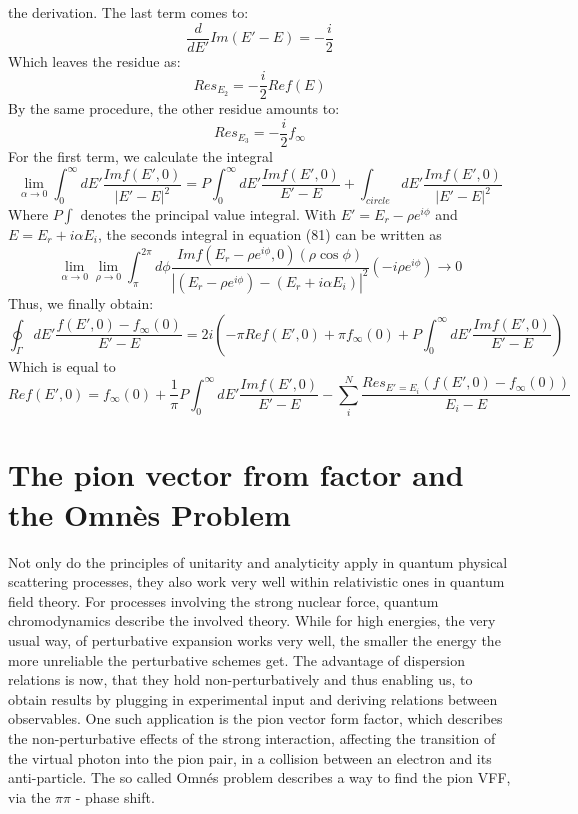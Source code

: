 \documentclass[a4paper]{article}
\begin{document}
the derivation. The last term comes to:
\begin{equation}
    \frac{d}{dE'}Im(E'-E)=-\frac{i}{2}
\end{equation}
Which leaves the residue as:
\begin{equation}
   Res_{E_2}=-\frac{i}{2}Ref(E)
\end{equation}
By the same procedure, the other residue amounts to:
\begin{equation}
    Res_{E_3}=-\frac{i}{2}f_\infty
\end{equation}
For the first term, we calculate the integral
\begin{equation}
   \lim\limits_{\alpha\rightarrow 0}\int_0^\infty dE'\frac{Imf(E',0)}{|E'-E|^2}=P\int_0^\infty dE'\frac{Imf(E',0)}{E'-E}+\int_{circle}dE'\frac{Imf(E',0)}{|E'-E|^2}
\end{equation}
Where $P\int$ denotes the principal value integral. With $E'=E_r-\rho e^{i\phi}$ and $E=E_r+i\alpha E_i$, the seconds integral in equation (81) can be written as
\begin{equation}
    \lim\limits_{\alpha\rightarrow 0}\lim\limits_{\rho\rightarrow 0}\int_\pi^{2\pi}d\phi\frac{Imf(E_r-\rho e^{i\phi},0)(\rho\cos{\phi})}{|(E_r-\rho e^{i\phi})-(E_r+i\alpha E_i)|^2}(-i\rho e^{i\phi})\rightarrow 0
\end{equation}
Thus, we finally obtain:
\begin{equation}
    \oint_\Gamma dE'\frac{f(E',0)-f_\infty(0)}{E'-E}=2i(-\pi Ref(E',0)+\pi f_\infty(0)+P\int_0^\infty dE'\frac{Imf(E',0)}{E'-E})
\end{equation}
Which is equal to
\begin{equation}
    Ref(E',0)=f_\infty(0)+\frac{1}{\pi}P\int_0^\infty dE'\frac{Imf(E',0)}{E'-E}-\sum_i^N\frac{Res_{E'=E_i}(f(E',0)-f_\infty(0))}{E_i-E}
\end{equation}

\section{The pion vector from factor and the Omn\`es Problem}
Not only do the principles of unitarity and analyticity apply in quantum
physical scattering processes, they also work very well within relativistic
ones in quantum field theory. For processes involving the strong nuclear force,
quantum chromodynamics describe the involved theory. While for high energies,
the very usual way, of perturbative expansion works very well, the smaller the
energy the more unreliable the perturbative schemes get. The advantage of
dispersion relations is now, that they hold non-perturbatively and thus
enabling us, to obtain results by plugging in experimental input and deriving
relations between observables. One such application is the pion vector form
factor, which describes the non-perturbative effects of the strong interaction,
affecting the transition of the virtual photon into the pion pair, in a
collision between an electron and its anti-particle. The so called Omnés
problem describes a way to find the pion VFF, via the $\pi\pi$ - phase shift.
\end{document}
